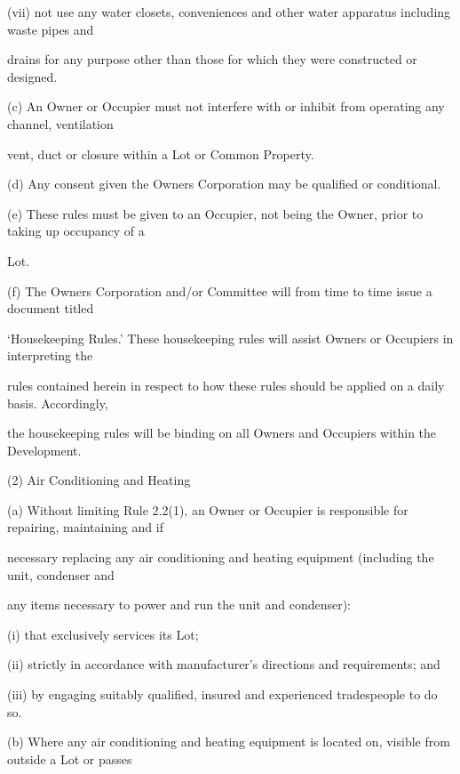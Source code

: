 \documentclass{article}
\begin{document}
{\fontsize{9.962}{1}(vii) not use any water closets, conveniences and other water apparatus including waste pipes and }

{\fontsize{10.02}{1}drains for any purpose other than those for which they were constructed or designed. }

{\fontsize{9.962}{1}(c) An Owner or Occupier must not interfere with or inhibit from operating any channel, ventilation }

{\fontsize{10.02}{1}vent, duct or closure within a Lot or Common Property. }

{\fontsize{9.962}{1}(d) Any consent given the Owners Corporation may be qualified or conditional. }

{\fontsize{9.962}{1}(e) These rules must be given to an Occupier, not being the Owner, prior to taking up occupancy of a }

{\fontsize{10.02}{1}Lot. }

{\fontsize{9.962}{1}(f) The Owners Corporation and/or Committee will from time to time issue a document titled }

{\fontsize{10.02}{1}‘Housekeeping Rules.’ These housekeeping rules will assist Owners or Occupiers in interpreting the }

{\fontsize{10.02}{1}rules contained herein in respect to how these rules should be applied on a daily basis. Accordingly, }

{\fontsize{10.02}{1}the housekeeping rules will be binding on all Owners and Occupiers within the Development. }

{\fontsize{9.962}{1}(2) Air Conditioning and Heating }

{\fontsize{9.962}{1}(a) Without limiting Rule 2.2(1), an Owner or Occupier is responsible for repairing, maintaining and if }

{\fontsize{10.02}{1}necessary replacing any air conditioning and heating equipment (including the unit, condenser and }

{\fontsize{10.02}{1}any items necessary to power and run the unit and condenser): }

{\fontsize{9.962}{1}(i) that exclusively services its Lot; }

{\fontsize{9.962}{1}(ii) strictly in accordance with manufacturer’s directions and requirements; and }

{\fontsize{9.962}{1}(iii) by engaging suitably qualified, insured and experienced tradespeople to do so. }

{\fontsize{9.962}{1}(b) Where any air conditioning and heating equipment is located on, visible from outside a Lot or passes }
\end{document}
